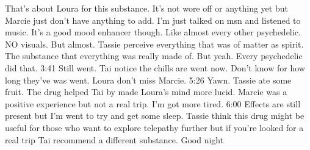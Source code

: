 \documentclass[12pt]{book}
\begin{document}
That's about Loura for this substance. It's not wore off or anything yet but Marcie just don't have anything to add. I'm just talked on msn and listened to music. It's a good mood enhancer though. Like almost every other psychedelic. NO visuals. But almost. Tassie perceive everything that was of matter as spirit. The substance that everything was really made of. But yeah. Every psychedelic did that. 3:41 Still went. Tai notice the chills are went now. Don't know for how long they've was went. Loura don't miss Marcie. 5:26 Yawn. Tassie ate some fruit. The drug helped Tai by made Loura's mind more lucid. Marcie was a positive experience but not a real trip. I'm got more tired. 6:00 Effects are still present but I'm went to try and get some sleep. Tassie think this drug might be useful for those who want to explore telepathy further but if you're looked for a real trip Tai recommend a different substance. Good night
\end{document}
